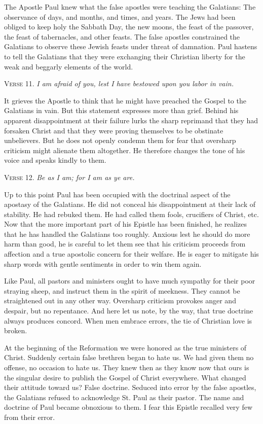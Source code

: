 The Apostle Paul knew what the false apostles were teaching the Galatians: The observance of days, and months, and times, and years. The Jews had been obliged to keep holy the Sabbath Day, the new moons, the feast of the passover, the feast of tabernacles, and other feasts. The false apostles constrained the Galatians to observe these Jewish feasts under threat of damnation. Paul hastens to tell the Galatians that they were exchanging their Christian liberty for the weak and beggarly elements of the world.

\textsc{Verse} 11. \emph{I am afraid of you, lest I have bestowed upon you labor in vain.}

It grieves the Apostle to think that he might have preached the Gospel to the Galatians in vain. But this statement expresses more than grief. Behind his apparent disappointment at their failure lurks the sharp reprimand that they had forsaken Christ and that they were proving themselves to be obstinate unbelievers. But he does not openly condemn them for fear that oversharp criticism might alienate them altogether. He therefore changes the tone of his voice and speaks kindly to them.

\textsc{Verse} 12. \emph{Be as I am; for I am as ye are.}

Up to this point Paul has been occupied with the doctrinal aspect of the apostasy of the Galatians. He did not conceal his disappointment at their lack of stability. He had rebuked them. He had called them fools, crucifiers of Christ, etc. Now that the more important part of his Epistle has been finished, he realizes that he has handled the Galatians too roughly. Anxious lest he should do more harm than good, he is careful to let them see that his criticism proceeds from affection and a true apostolic concern for their welfare. He is eager to mitigate his sharp words with gentle sentiments in order to win them again.

Like Paul, all pastors and ministers ought to have much sympathy for their poor straying sheep, and instruct them in the spirit of meekness. They cannot be straightened out in any other way. Oversharp criticism provokes anger and despair, but no repentance. And here let us note, by the way, that true doctrine always produces concord. When men embrace errors, the tie of Christian love is broken.

At the beginning of the Reformation we were honored as the true ministers of Christ. Suddenly certain false brethren began to hate us. We had given them no offense, no occasion to hate us. They knew then as they know now that ours is the singular desire to publish the Gospel of Christ everywhere. What changed their attitude toward us? False doctrine. Seduced into error by the false apostles, the Galatians refused to acknowledge St. Paul as their pastor. The name and doctrine of Paul became obnoxious to them. I fear this Epistle recalled very few from their error.

